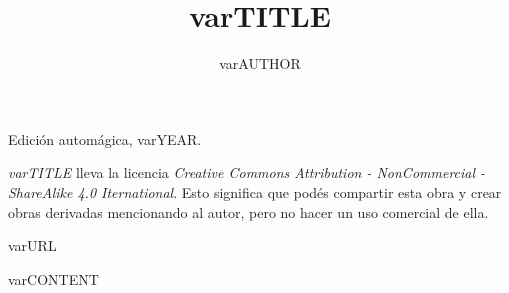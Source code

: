 \documentclass[var{FONT_SIZE}pt,twoside,openright]{book}
\title{var{TITLE}}
\author{var{AUTHOR}}
\date{}
\begin{document}

\pagestyle{plain}


%
%

\maketitle

\cleardoublepage

\thispagestyle{empty}
\noindent
Edición automágica, var{YEAR}.\\

\vspace{0.5cm}

\noindent
\emph{var{TITLE}} lleva la licencia
\emph{Creative Commons Attribution - NonCommercial - ShareAlike 4.0 Iternational}.
Esto significa que podés compartir esta obra y crear obras derivadas
mencionando al autor, pero no ha\-cer un uso comercial de ella.

\vfill

\noindent
var{URL}\\

\cleardoublepage


\renewcommand*\contentsname{var{INDEX_TITLE}}

\tableofcontents


\cleardoublepage


var{CONTENT}

\cleardoublepage

%
\end{document}

